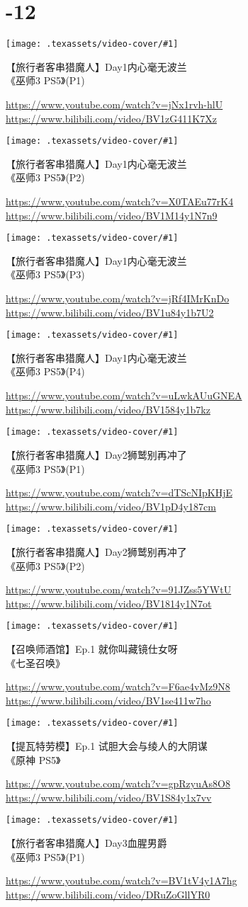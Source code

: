


\newcommand{\videoitem}[4]{
    \parbox[b][29mm][b]{\linewidth}{%
        \texttt{[image: .texassets/video-cover/\#1]}%
        \hfill%
        \parbox[b][29mm][b]{27em}{
            \raggedright
            \large#2\par\vfill
            \footnotesize\ttfamily
            \textcolor{gray}{%
                \href{https://www.youtube.com/watch?v=#3}{https://www.youtube.com/watch?v=#3}\linebreak%
                \href{https://www.bilibili.com/video/#4}{https://www.bilibili.com/video/#4}%
            }\par\vskip 2pt%
        }%
    }%
    \par
    \vskip 11pt
}




\section*{-12}

\videoitem{wit3ps5/wit3ps5-day001-1}{【旅行者客串猎魔人】Day1内心毫无波兰\\《巫师3 PS5》(P1)}{jNx1rvh-hlU}{BV1zG411K7Xz}
\videoitem{wit3ps5/wit3ps5-day001-2}{【旅行者客串猎魔人】Day1内心毫无波兰\\《巫师3 PS5》(P2)}{X0TAEu77rK4}{BV1M14y1N7n9}
\videoitem{wit3ps5/wit3ps5-day001-3}{【旅行者客串猎魔人】Day1内心毫无波兰\\《巫师3 PS5》(P3)}{jRf4IMrKnDo}{BV1u84y1b7U2}
\videoitem{wit3ps5/wit3ps5-day001-4}{【旅行者客串猎魔人】Day1内心毫无波兰\\《巫师3 PS5》(P4)}{uLwkAUuGNEA}{BV1584y1b7kz}
\videoitem{wit3ps5/wit3ps5-day002-1}{【旅行者客串猎魔人】Day2狮鹫别再冲了\\《巫师3 PS5》(P1)}{dTScNIpKHjE}{BV1pD4y187cm}
\videoitem{wit3ps5/wit3ps5-day002-2}{【旅行者客串猎魔人】Day2狮鹫别再冲了\\《巫师3 PS5》(P2)}{91JZss5YWtU}{BV1814y1N7ot}

\videoitem{ys-geninv/ysgi-0001}{【召唤师酒馆】Ep.1 就你叫藏镜仕女呀\\《七圣召唤》}{F6ae4vMz9N8}{BV1se411w7ho}

\videoitem{ys-std/ys-0001}{【提瓦特劳模】Ep.1 试胆大会与绫人的大阴谋\\《原神 PS5》}{gpRzyuAs8O8}{BV1S84y1x7vv}

\videoitem{wit3ps5/wit3ps5-day003-1}{【旅行者客串猎魔人】Day3血腥男爵\\《巫师3 PS5》(P1)}{BV1tV4y1A7hg}{DRuZoGllYR0}

